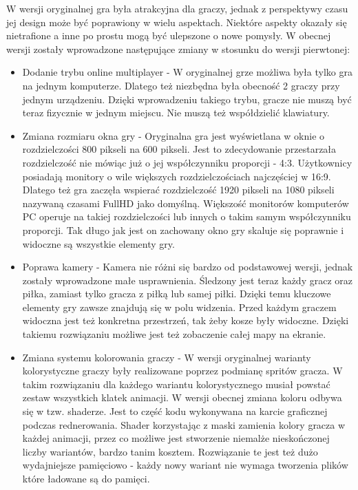 \documentclass[a4paper,12pt,twoside,openany]{report}
\begin{document}
W wersji oryginalnej gra była atrakcyjna dla graczy, jednak z perspektywy czasu jej design może być poprawiony w wielu aspektach. Niektóre aspekty okazały się nietrafione a inne po prostu mogą być ulepszone o nowe pomysły. W obecnej wersji zostały wprowadzone następujące zmiany w stosunku do wersji pierwtonej:
\begin{itemize}
    \item Dodanie trybu online multiplayer - W oryginalnej grze możliwa była tylko gra na jednym komputerze. Dlatego też niezbędna była obecność 2 graczy przy jednym urządzeniu. Dzięki wprowadzeniu takiego trybu, gracze nie muszą być teraz fizycznie w jednym miejscu. Nie muszą też współdzielić klawiatury.
    \item Zmiana rozmiaru okna gry - Oryginalna gra jest wyświetlana w oknie o rozdzielczości 800 pikseli na 600 pikseli. Jest to zdecydowanie przestarzała rozdzielczość nie mówiąc już o jej współczynniku proporcji - 4:3. Użytkownicy posiadają monitory o wile większych rozdzielczościach najczęściej w 16:9. Dlatego też gra zaczęła wspierać rozdzielczość 1920 pikseli na 1080 pikseli nazywaną czasami FullHD jako domyślną. Większość monitorów komputerów PC operuje na takiej rozdzielczości lub innych o takim samym współczynniku proporcji. Tak długo jak jest on zachowany okno gry skaluje się poprawnie i widoczne są wszystkie elementy gry.
    \item Poprawa kamery - Kamera nie różni się bardzo od podstawowej wersji, jednak zostały wprowadzone małe usprawnienia. Śledzony jest teraz każdy gracz oraz piłka, zamiast tylko gracza z piłką lub samej piłki. Dzięki temu kluczowe elementy gry zawsze znajdują się w polu widzenia. Przed każdym graczem widoczna jest też konkretna przestrzeń, tak żeby kosze były widoczne. Dzięki takiemu rozwiązaniu możliwe jest też zobaczenie całej mapy na ekranie.  
    \item Zmiana systemu kolorowania graczy - W wersji oryginalnej warianty kolorystyczne graczy były realizowane poprzez podmianę spritów gracza. W takim rozwiązaniu dla każdego wariantu kolorystycznego musiał powstać zestaw wszystkich klatek animacji. W wersji obecnej zmiana koloru odbywa się w tzw. shaderze. Jest to część kodu wykonywana na karcie graficznej podczas rednerowania. Shader korzystając z maski zamienia kolory gracza w każdej animacji, przez co możliwe jest stworzenie niemalże nieskończonej liczby wariantów, bardzo tanim kosztem. Rozwiązanie te jest też dużo wydajniejsze pamięciowo - każdy nowy wariant nie wymaga tworzenia plików które ładowane są do pamięci.

\end{itemize}
\end{document}

